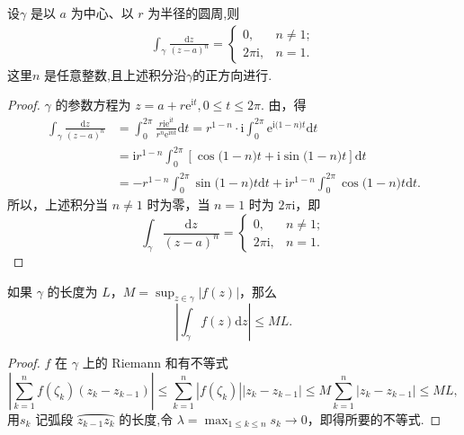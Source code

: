 \documentclass[../../main.tex]{subfiles}%
\begin{document}
\begin{proposition}\label{proposition:例3.1.4}
设\( \gamma \) 是以 \( a \) 为中心、以 \( r \) 为半径的圆周,则
\begin{align*}
\int_\gamma \frac{\mathrm{d}z}{(z - a)^n} = 
\begin{cases} 
0, & n \neq 1; \\
2\pi\mathrm{i}, & n = 1.
\end{cases}
\end{align*}
这里\( n \) 是任意整数,且上述积分沿$\gamma$的正方向进行.
\end{proposition}
\begin{proof}

\( \gamma \) 的参数方程为 \( z = a + r\mathrm{e}^{\mathrm{i}t}, 0 \leqslant t \leqslant 2\pi \). 由，得
\begin{align*}
\int_{\gamma}{\frac{\mathrm{d}z}{(z-a)^n}}&=\int_0^{2\pi}{\frac{r\mathrm{ie}^{\mathrm{i}t}}{r^n\mathrm{e}^{\mathrm{i}nt}}\mathrm{d}t}=r^{1-n}\cdot \mathrm{i}\int_0^{2\pi}{\mathrm{e}^{\mathrm{i(}1-n)t}\mathrm{d}t}
\\
&=\mathrm{i}r^{1-n}\int_0^{2\pi}{\left[ \cos\mathrm{(}1-n)t+\mathrm{i}\sin\mathrm{(}1-n)t \right] \mathrm{d}t}
\\
&=-r^{1-n}\int_0^{2\pi}{\sin\mathrm{(}1-n)t\mathrm{d}t}+\mathrm{i}r^{1-n}\int_0^{2\pi}{\cos\mathrm{(}1-n)t\mathrm{d}t}.
\end{align*}
所以，上述积分当 \( n \neq 1 \) 时为零，当 \( n = 1 \) 时为 \( 2\pi\mathrm{i} \)，即
\[
\int_\gamma \frac{\mathrm{d}z}{(z - a)^n} = 
\begin{cases} 
0, & n \neq 1; \\
2\pi\mathrm{i}, & n = 1.
\end{cases}
\]

\end{proof}

\begin{theorem}\label{theorem:长大不等式}
如果 \( \gamma \) 的长度为 \( L \)，\( M = \sup_{z \in \gamma} |f(z)| \)，那么
\[
\left| \int_\gamma f(z)\mathrm{d}z \right| \leqslant ML. \tag{4}
\]
\end{theorem}
\begin{proof}

\( f \) 在 \( \gamma \) 上的 Riemann 和有不等式
\[
\left| \sum_{k = 1}^n f(\zeta_k)(z_k - z_{k - 1}) \right| \leqslant \sum_{k = 1}^n |f(\zeta_k)| |z_k - z_{k - 1}|
\leqslant M \sum_{k = 1}^n |z_k - z_{k - 1}|
\leqslant ML,
\]
用\( s_k \) 记弧段 \( \wideparen{z_{k - 1}z_k} \) 的长度,令 \( \lambda = \max_{1 \leqslant k \leqslant n} s_k \to 0 \)，即得所要的不等式.

\end{proof}
\end{document}
